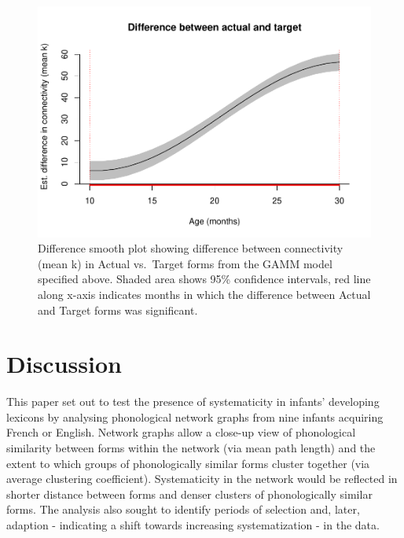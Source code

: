 \documentclass[
  man]{apa6}
\begin{document}
\begin{figure}
\centering
\includegraphics{NetworkGraphs_R1_files/figure-latex/difference-plot-mean-k-1.pdf}
\caption{\label{fig:difference-plot-mean-k}Difference smooth plot showing difference between connectivity (mean k) in Actual vs.~Target forms from the GAMM model specified above. Shaded area shows 95\% confidence intervals, red line along x-axis indicates months in which
the difference between Actual and Target forms was significant.}
\end{figure}

\section{Discussion}\label{discussion}

This paper set out to test the presence of systematicity in infants' developing lexicons by analysing phonological network graphs from nine infants acquiring French or English. Network graphs allow a close-up view of phonological similarity between forms within the network (via mean path length) and the extent to which groups of phonologically similar forms cluster together (via average clustering coefficient). Systematicity in the network would be reflected in shorter distance between forms and denser clusters of phonologically similar forms. The analysis also sought to identify periods of selection and, later, adaption - indicating a shift towards increasing systematization - in the data.
\end{document}

